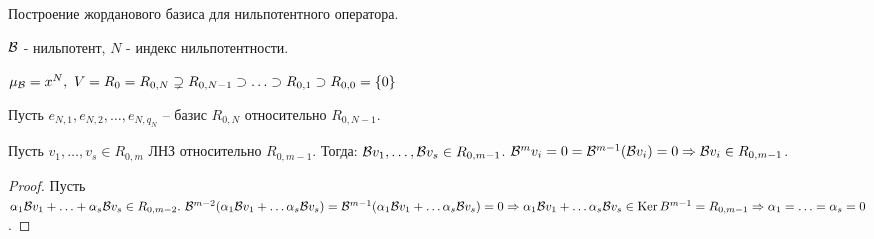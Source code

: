 \documentclass[main]{subfiles}
\begin{document}
Построение жорданового базиса для нильпотентного оператора.

$\mathcal{B}$ - нильпотент, $N$ - индекс нильпотентности.

$\mu_{\mathcal{B}} = x^N, \ V = R_0 = R_{0, N} \supsetneq R_{0, N-1} \supset \ldots \supset R_{0, 1} \supset R_{0, 0} = \{0\}$

Пусть $e_{N, 1}, e_{N,2}, \ldots, e_{N, q_N}$ -- базис $R_{0, N}$ относительно $R_{0, N-1}$.

\begin{lemma}
  Пусть $v_1, \ldots, v_s \in R_{0, m}$ ЛНЗ относительно $R_{0, m-1}$.
  Тогда: $\mathcal{B} v_1, \ldots, \mathcal{B} v_s \in R_{0, m-1}$. $\mathcal{B}^m v_i = 0 = \mathcal{B}^{m-1}(\mathcal{B} v_i) = 0 \Rightarrow \mathcal{B} v_i \in R_{0, m-1}$.
\end{lemma}

\begin{proof}
  Пусть $\alpha_1 \mathcal{B} v_1 + \ldots + \alpha_s \mathcal{B} v_s \in R_{0, m-2}. \ \mathcal{B}^{m-2}(\alpha_1 \mathcal{B} v_1 + \ldots \alpha_s \mathcal{B} v_s) =
    \mathcal{B}^{m-1}(\alpha_1 \mathcal{B} v_1 + \ldots \alpha_s \mathcal{B} v_s) = 0 \Rightarrow \alpha_1 \mathcal{B} v_1 + \ldots \alpha_s \mathcal{B} v_s \in \operatorname{Ker} B^{m-1} = R_{0, m-1}
    \Rightarrow \alpha_1 = \ldots = \alpha_s = 0$.
\end{proof}
\end{document}

